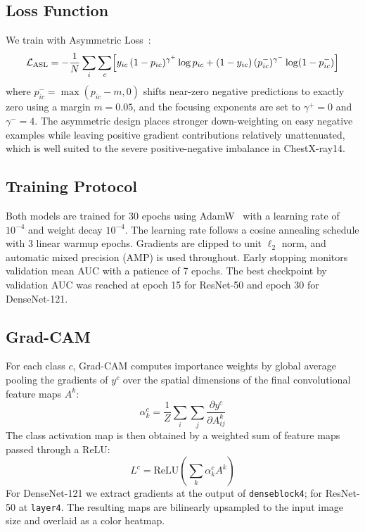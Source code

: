 \documentclass[runningheads]{llncs}
\begin{document}
\subsection{Loss Function}
We train with Asymmetric Loss~\cite{ridnik2021asl}:
\begin{equation}
  \mathcal{L}_{\text{ASL}} = -\frac{1}{N}\sum_{i}\sum_{c}
  \Bigl[ y_{ic}\,(1-p_{ic})^{\gamma^+}\log p_{ic} +
  (1-y_{ic})\,(p^-_{ic})^{\gamma^-}\log(1-p^-_{ic}) \Bigr]
  \label{eq:asl}
\end{equation}
where $p^-_{ic} = \max(p_{ic} - m, 0)$ shifts near-zero negative
predictions to exactly zero using a margin $m = 0.05$, and the
focusing exponents are set to $\gamma^+ = 0$ and $\gamma^- = 4$.
The asymmetric design places stronger down-weighting on easy
negative examples while leaving positive gradient contributions
relatively unattenuated, which is well suited to the severe
positive-negative imbalance in ChestX-ray14.

\subsection{Training Protocol}
Both models are trained for 30 epochs using
AdamW~\cite{loshchilov2019adamw} with a learning rate of $10^{-4}$
and weight decay $10^{-4}$. The learning rate follows a cosine
annealing schedule with 3 linear warmup epochs. Gradients are
clipped to unit $\ell_2$ norm, and automatic mixed precision (AMP)
is used throughout. Early stopping monitors validation mean AUC
with a patience of 7 epochs. The best checkpoint by validation AUC
was reached at epoch 15 for ResNet-50 and epoch 30 for DenseNet-121.

\subsection{Grad-CAM}
For each class $c$, Grad-CAM computes importance weights by global
average pooling the gradients of $y^c$ over the spatial dimensions
of the final convolutional feature maps $A^k$:
\begin{equation}
  \alpha_k^c = \frac{1}{Z}\sum_i\sum_j
  \frac{\partial y^c}{\partial A^k_{ij}}
  \label{eq:gradcam_weights}
\end{equation}
The class activation map is then obtained by a weighted sum of
feature maps passed through a ReLU:
\begin{equation}
  L^c = \text{ReLU}\!\left(\sum_k \alpha_k^c A^k \right)
  \label{eq:gradcam_map}
\end{equation}
For DenseNet-121 we extract gradients at the output of
\texttt{denseblock4}; for ResNet-50 at \texttt{layer4}. The
resulting maps are bilinearly upsampled to the input image size
and overlaid as a color heatmap.
\end{document}
